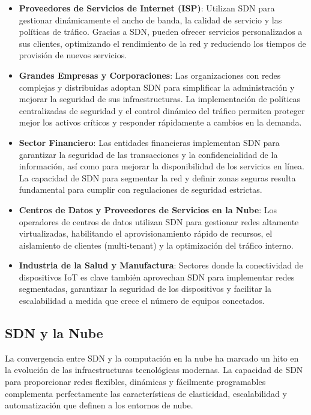 {            \begin{itemize}
                \item \textbf{Proveedores de Servicios de Internet (ISP)}: Utilizan SDN para gestionar dinámicamente el ancho de banda, la calidad de servicio y las políticas de tráfico. Gracias a SDN, pueden ofrecer servicios personalizados a sus clientes, optimizando el rendimiento de la red y reduciendo los tiempos de provisión de nuevos servicios.
                \item \textbf{Grandes Empresas y Corporaciones}: Las organizaciones con redes complejas y distribuidas adoptan SDN para simplificar la administración y mejorar la seguridad de sus infraestructuras. La implementación de políticas centralizadas de seguridad y el control dinámico del tráfico permiten proteger mejor los activos críticos y responder rápidamente a cambios en la demanda.
                \item \textbf{Sector Financiero}: Las entidades financieras implementan SDN para garantizar la seguridad de las transacciones y la confidencialidad de la información, así como para mejorar la disponibilidad de los servicios en línea. La capacidad de SDN para segmentar la red y definir zonas seguras resulta fundamental para cumplir con regulaciones de seguridad estrictas.
                \item \textbf{Centros de Datos y Proveedores de Servicios en la Nube}: Los operadores de centros de datos utilizan SDN para gestionar redes altamente virtualizadas, habilitando el aprovisionamiento rápido de recursos, el aislamiento de clientes (multi-tenant) y la optimización del tráfico interno.
                \item \textbf{Industria de la Salud y Manufactura}: Sectores donde la conectividad de dispositivos IoT es clave también aprovechan SDN para implementar redes segmentadas, garantizar la seguridad de los dispositivos y facilitar la escalabilidad a medida que crece el número de equipos conectados.
            \end{itemize}
            
        \subsection{SDN y la Nube}
            La convergencia entre SDN y la computación en la nube ha marcado un hito en la evolución de las infraestructuras tecnológicas modernas. La capacidad de SDN para proporcionar redes flexibles, dinámicas y fácilmente programables complementa perfectamente las características de elasticidad, escalabilidad y automatización que definen a los entornos de nube.
            
}
